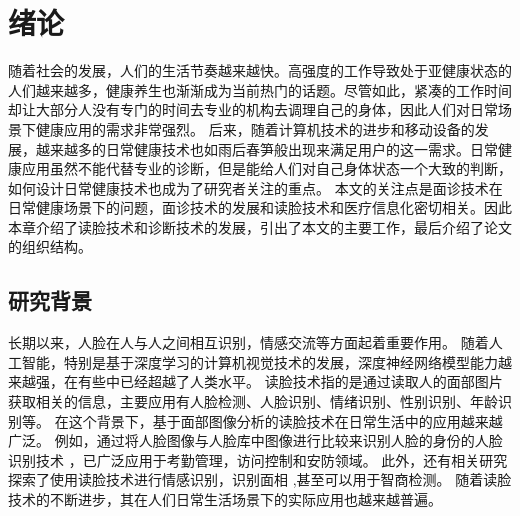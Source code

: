 \chapter{绪论}

随着社会的发展，人们的生活节奏越来越快。高强度的工作导致处于亚健康状态的人们越来越多，健康养生也渐渐成为当前热门的话题。尽管如此，紧凑的工作时间却让大部分人没有专门的时间去专业的机构去调理自己的身体，因此人们对日常场景下健康应用的需求非常强烈。
后来，随着计算机技术的进步和移动设备的发展，越来越多的日常健康技术也如雨后春笋般出现来满足用户的这一需求。日常健康应用虽然不能代替专业的诊断，但是能给人们对自己身体状态一个大致的判断，如何设计日常健康技术也成为了研究者关注的重点。
本文的关注点是面诊技术在日常健康场景下的问题，面诊技术的发展和读脸技术和医疗信息化密切相关。因此本章介绍了读脸技术和诊断技术的发展，引出了本文的主要工作，最后介绍了论文的组织结构。

\section{研究背景}

长期以来，人脸在人与人之间相互识别，情感交流等方面起着重要作用。
随着人工智能，特别是基于深度学习的计算机视觉技术的发展，深度神经网络模型能力越来越强，在有些中已经超越了人类水平\cite{he2015delving}。
读脸技术指的是通过读取人的面部图片获取相关的信息，主要应用有人脸检测、人脸识别、情绪识别、性别识别、年龄识别等。
在这个背景下，基于面部图像分析的读脸技术在日常生活中的应用越来越广泛。
例如，通过将人脸图像与人脸库中图像进行比较来识别人脸的身份的人脸识别技术 \cite{Zhang2016Joint}\cite{Schroff2015FaceNet}，已广泛应用于考勤管理\cite{surekha2017attendance}，访问控制\cite{atick2000continuous}和安防领域\cite{liu2005ibotguard}。
此外，还有相关研究探索了使用读脸技术进行情感识别\cite{corneanu2016survey}，识别面相 \cite{Li2007Online}\cite{Tempark2012Chinese},甚至可以用于智商检测\cite{Kleisner2014Perceived}。
随着读脸技术的不断进步，其在人们日常生活场景下的实际应用也越来越普遍。

